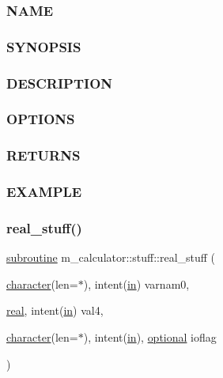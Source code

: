 \subsubsection*{N\+A\+ME}

\subsubsection*{S\+Y\+N\+O\+P\+S\+IS}

\subsubsection*{D\+E\+S\+C\+R\+I\+P\+T\+I\+ON}

\subsubsection*{O\+P\+T\+I\+O\+NS}

\subsubsection*{R\+E\+T\+U\+R\+NS}

\subsubsection*{E\+X\+A\+M\+P\+LE}\mbox{\label{interfacem__calculator_1_1stuff_a7d6dbcffdf1001e3104f2947699aca22}} 
\subsubsection{\texorpdfstring{real\+\_\+stuff()}{real\_stuff()}}
{\footnotesize\ttfamily \hyperlink{M__stopwatch_83_8txt_acfbcff50169d691ff02d4a123ed70482}{subroutine} m\+\_\+calculator\+::stuff\+::real\+\_\+stuff (\begin{DoxyParamCaption}\item[{\hyperlink{option__stopwatch_83_8txt_abd4b21fbbd175834027b5224bfe97e66}{character}(len=$\ast$), intent(\hyperlink{M__journal_83_8txt_afce72651d1eed785a2132bee863b2f38}{in})}]{varnam0,  }\item[{\hyperlink{read__watch_83_8txt_abdb62bde002f38ef75f810d3a905a823}{real}, intent(\hyperlink{M__journal_83_8txt_afce72651d1eed785a2132bee863b2f38}{in})}]{val4,  }\item[{\hyperlink{option__stopwatch_83_8txt_abd4b21fbbd175834027b5224bfe97e66}{character}(len=$\ast$), intent(\hyperlink{M__journal_83_8txt_afce72651d1eed785a2132bee863b2f38}{in}), \hyperlink{option__stopwatch_83_8txt_aa4ece75e7acf58a4843f70fe18c3ade5}{optional}}]{ioflag }\end{DoxyParamCaption})\hspace{0.3cm}{\ttfamily [private]}}



